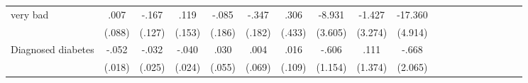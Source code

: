 \documentclass[12pt,english,british]{article}
\newcommand{\sym}[1]{\rlap{#1}}%
\begin{document}
\begin{table}
\begin{center}
\begin{adjustbox}{max width=\linewidth}
{\begin{tabular}{l*{9}{S
S}}
\hspace*{10mm}very bad        &     .007         &    -.167         &     .119         &    -.085         &    -.347\sym{*}  &     .306         &   -8.931\sym{**} &   -1.427         &  -17.360\sym{***}\\
                &   (.088)         &   (.127)         &   (.153)         &   (.186)         &   (.182)         &   (.433)         &  (3.605)         &  (3.274)         &  (4.914)         \\

Diagnosed diabetes&    -.052\sym{***}&    -.032         &    -.040\sym{*}  &     .030         &     .004         &     .016         &    -.606         &     .111         &    -.668         \\
                &   (.018)         &   (.025)         &   (.024)         &   (.055)         &   (.069)         &   (.109)         &  (1.154)         &  (1.374)         &  (2.065)         \\


\end{tabular}}
\end{adjustbox}
\end{center}
\end{table}
\end{document}
